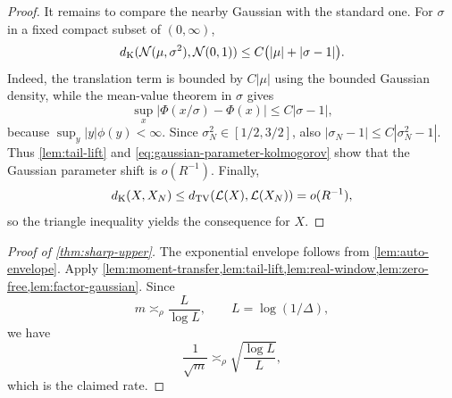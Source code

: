 \begin{proof}
It remains to compare the nearby Gaussian with the standard one. For $\sigma$ in a fixed compact subset of $(0,\infty)$,
\begin{equation}\label{eq:gaussian-parameter-kolmogorov}
d_{\mathrm K}(\mathcal N(\mu,\sigma^2),\mathcal N(0,1))
\le C\bigl(|\mu|+|\sigma-1|\bigr).
\end{equation}
Indeed, the translation term is bounded by $C|\mu|$ using the bounded Gaussian density, while the mean-value theorem in $\sigma$ gives
\[
\sup_x|\Phi(x/\sigma)-\Phi(x)|
\le C|\sigma-1|,
\]
because $\sup_y|y|\phi(y)<\infty$. Since $\sigma_N^2\in[1/2,3/2]$, also $|\sigma_N-1|\le C|\sigma_N^2-1|$. Thus \cref{lem:tail-lift} and \eqref{eq:gaussian-parameter-kolmogorov} show that the Gaussian parameter shift is $o(R^{-1})$. Finally,
\[
d_{\mathrm K}(X,X_N)\le d_{\mathrm{TV}}(\mathcal L(X),\mathcal L(X_N))=o(R^{-1}),
\]
so the triangle inequality yields the consequence for $X$.
\end{proof}

\begin{proof}[Proof of \cref{thm:sharp-upper}]
The exponential envelope follows from \cref{lem:auto-envelope}. Apply \cref{lem:moment-transfer,lem:tail-lift,lem:real-window,lem:zero-free,lem:factor-gaussian}. Since
\[
m\asymp_\rho\frac{L}{\log L},\qquad L=\log(1/\Delta),
\]
we have
\[
\frac1{\sqrt m}
\asymp_\rho
\sqrt{\frac{\log L}{L}},
\]
which is the claimed rate.
\end{proof}
